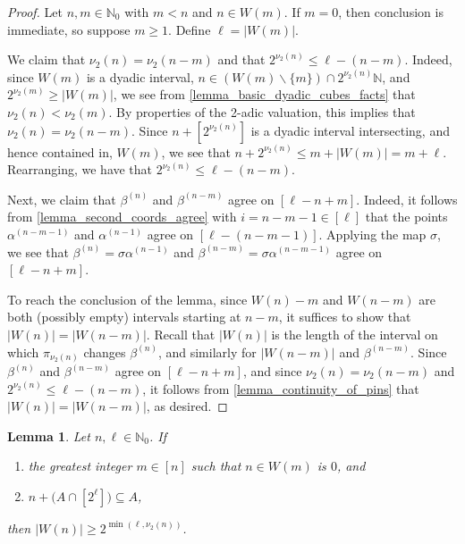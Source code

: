 \documentclass[letter,11pt]{article}
\theoremstyle{plain}
\newtheorem{lemma}[theorem]{Lemma}
\theoremstyle{definition}
\theoremstyle{plain}
\theoremstyle{plain}
\numberwithin{equation}{section}
\newcommand{\N}{\mathbb{N}}
\renewcommand{\leq}{\leqslant}
\renewcommand{\geq}{\geqslant}
\renewcommand{\setminus}{\backslash}
\newcommand{\bpunch}{\beta}
\newcommand{\apunch}{\alpha}
\begin{document}
\begin{proof}
Let $n, m \in \N_0$ with $m < n$ and $n \in W(m)$.  If $m = 0$, then conclusion is immediate, so suppose $m \geq 1$.  Define $\ell = |W(m)|$.

We claim that $\nu_2(n) = \nu_2(n-m)$ and that $2^{\nu_2(n)} \leq \ell - (n-m)$.  Indeed, since $W(m)$ is a dyadic interval, $n \in (W(m) \setminus\{m\}) \cap 2^{\nu_2(n)} \N$, and $2^{\nu_2(m)} \geq |W(m)|$, we see from \cref{lemma_basic_dyadic_cubes_facts} that $\nu_2(n) < \nu_2(m)$.  By properties of the 2-adic valuation, this implies that $\nu_2(n) = \nu_2(n-m)$.  Since $n + [2^{\nu_2(n)}]$ is a dyadic interval intersecting, and hence contained in, $W(m)$, we see that $n + 2^{\nu_2(n)} \leq m + |W(m)| = m + \ell$.  Rearranging, we have that $2^{\nu_2(n)} \leq \ell - (n-m)$.



Next, we claim that $\bpunch^{(n)}$ and $\bpunch^{(n-m)}$ agree on $[\ell - n+m]$.  Indeed, it follows from \cref{lemma_second_coords_agree} with $i = n-m-1 \in [\ell]$ that the points $\apunch^{(n-m-1)}$ and $\apunch^{(n-1)}$ agree on $[\ell - (n-m-1)]$.  Applying the map $\sigma$, we see that $\bpunch^{(n)} = \sigma \apunch^{(n-1)}$ and $\bpunch^{(n-m)} = \sigma \apunch^{(n-m-1)}$ agree on $[\ell - n+m]$.



To reach the conclusion of the lemma, since $W(n)-m$ and $W(n-m)$ are both (possibly empty) intervals starting at $n-m$, it suffices to show that $|W(n)| = |W(n-m)|$. Recall that $|W(n)|$ is the length of the interval on which $\pi_{\nu_2(n)}$ changes $\bpunch^{(n)}$, and similarly for $|W(n-m)|$ and $\bpunch^{(n-m)}$.  Since $\bpunch^{(n)}$ and $\bpunch^{(n-m)}$ agree on $[\ell - n+m]$, and since $\nu_2(n) = \nu_2(n-m)$ and $2^{\nu_2(n)} \leq \ell - (n-m)$, it follows from \cref{lemma_continuity_of_pins} that $|W(n)| = |W(n-m)|$, as desired.
\end{proof}



\begin{lemma}
\label{lemma_punches_at_new_elements}
    Let $n, \ell \in \N_0$.  If
    \begin{enumerate}
        \item \label{item_n_is_new_position}
        the greatest integer $m \in [n]$ such that $n \in W(m)$ is $0$, and

        \item \label{item_original_A_is_punchable_at_n}
        $n + \big(A \cap [2^{\ell}]\big) \subseteq A$,
    \end{enumerate}
    then $|W(n)| \geq 2^{\min(\ell,\nu_2(n))}$.
\end{lemma}
\end{document}
